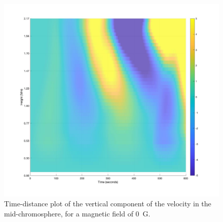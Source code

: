 \documentclass[physics,article,submit,pdftex,moreauthors]{Definitions/mdpi}
\begin{document}


\begin{figure}
\centering
\label{td_vert_dif_bv0G_100G_300}
\includegraphics[scale=0.2]{td_vert_bv0G_300.jpg}
\caption{Time-distance plot of the vertical component of the velocity in the mid-chromosphere, for a magnetic field of 0~G.}
\end{figure}
\end{document}
